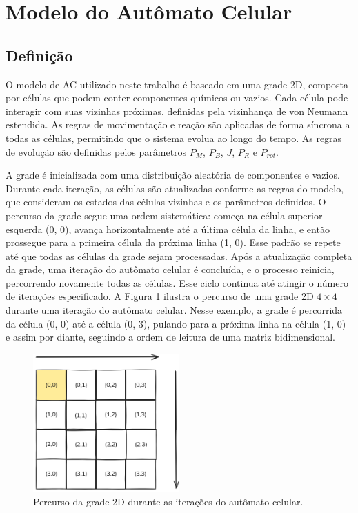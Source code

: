 \documentclass[12pt,oneside]{report}
\begin{document}
\section{Modelo do Autômato Celular}

\subsection{Definição}

O modelo de AC utilizado neste trabalho é baseado em uma grade 2D, composta por células que podem conter componentes químicos ou vazios. Cada célula pode interagir com suas vizinhas próximas, definidas pela vizinhança de von Neumann estendida. As regras de movimentação e reação são aplicadas de forma síncrona a todas as células, permitindo que o sistema evolua ao longo do tempo. As regras de evolução são definidas pelos parâmetros \hyperref[subsubsec:Pm]{$P_M$}, \hyperref[subsubsec:Pb]{$P_B$}, \hyperref[subsubsec:J]{$J$}, \hyperref[subsubsec:Pr]{$P_R$} e \hyperref[subsubsec:Prot]{$P_{rot}$}.

A grade é inicializada com uma distribuição aleatória de componentes e vazios. Durante cada iteração, as células são atualizadas conforme as regras do modelo, que consideram os estados das células vizinhas e os parâmetros definidos. O percurso da grade segue uma ordem sistemática: começa na célula superior esquerda (0, 0), avança horizontalmente até a última célula da linha, e então prossegue para a primeira célula da próxima linha (1, 0). Esse padrão se repete até que todas as células da grade sejam processadas. Após a atualização completa da grade, uma iteração do autômato celular é concluída, e o processo reinicia, percorrendo novamente todas as células. Esse ciclo continua até atingir o número de iterações especificado. A Figura \ref{fig:percorre_grade} ilustra o percurso de uma grade 2D $4 \times 4$ durante uma iteração do autômato celular. Nesse exemplo, a grade é percorrida da célula (0, 0) até a célula (0, 3), pulando para a próxima linha na célula (1, 0) e assim por diante, seguindo a ordem de leitura de uma matriz bidimensional.

\begin{figure}[H]
    \centering
    \includegraphics[width=0.5\textwidth]{percorre_grade.png}
    \caption{\small Percurso da grade 2D durante as iterações do autômato celular.}
    \label{fig:percorre_grade}
\end{figure}
\end{document}
